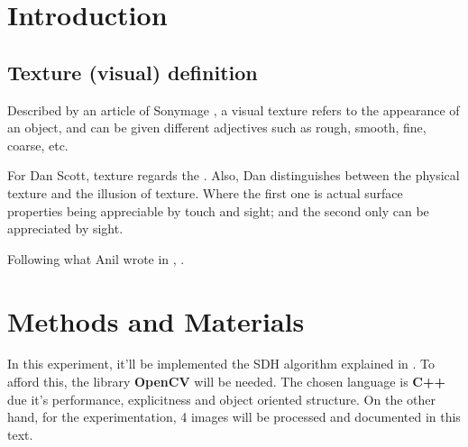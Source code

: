 \section{Introduction}
\subsection{Texture (visual) definition}

Described by an article of Sonymage \cite{sonymage_TexturaVisual}, a visual texture refers
to the appearance of an object, and can be given different adjectives such as rough, smooth,
fine, coarse, etc.

For Dan Scott, texture regards the \cite {drawpaintaVET}.
Also, Dan distinguishes between the physical texture and the illusion of texture.
Where the first one is actual surface properties being appreciable by touch and sight;
and the second only can be appreciated by sight.

Following what Anil wrote in \cite{Jain1988-vs}, .

\section{Methods and Materials}
In this experiment, it'll be implemented the SDH algorithm explained in \cite{syT0826}.
To afford this, the library \textbf{OpenCV} will be needed.
The chosen language is \textbf{C++} due it's performance, explicitness and object oriented
structure.
On the other hand, for the experimentation, 4 images will be processed and documented
in this text.


